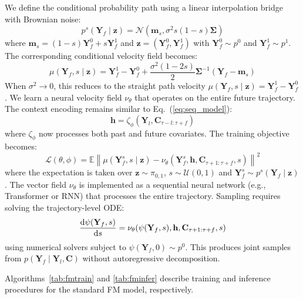 \documentclass[a4paper,10pt,twocolumn,preprint,3p]{elsarticle}
\begin{document}
We define the conditional probability path using a linear interpolation bridge with Brownian noise:
\begin{equation}
    p^s(\mathbf{Y}_f \mid \mathbf{z}) = \mathcal{N}\left(\mathbf{m}_s, \sigma^2 s(1-s)\mathbf{\Sigma}\right)
\end{equation}
where $\mathbf{m}_s = (1-s)\mathbf{Y}_f^0 + s\mathbf{Y}_f^1$ and $\mathbf{z} = (\mathbf{Y}_f^0, \mathbf{Y}_f^1)$ with $\mathbf{Y}_f^0 \sim p^0$ and $\mathbf{Y}_f^1 \sim p^1$. The corresponding conditional velocity field becomes:
\begin{equation}
    \mu(\mathbf{Y}_f, s\mid\mathbf{z}) = \mathbf{Y}_f^1 - \mathbf{Y}_f^0 + \frac{\sigma^2(1-2s)}{2}\mathbf{\Sigma}^{-1}(\mathbf{Y}_f - \mathbf{m}_s)
\end{equation}
When $\sigma^2 \to 0$, this reduces to the straight path velocity $\mu(\mathbf{Y}_f,s\mid\mathbf{z}) = \mathbf{Y}_f^1 - \mathbf{Y}_f^0$.
We learn a neural velocity field $\nu_\theta$ that operates on the entire future trajectory. The context encoding remains similar to Eq.~(\ref{eq:seq_model}):
\begin{equation}
    \mathbf{h} = \zeta_\phi(\mathbf{Y}_l, \mathbf{C}_{\tau-l:\tau+f})
\end{equation}
where $\zeta_\phi$ now processes both past and future covariates. The training objective becomes:
\begin{equation}
    \mathcal{L}(\theta, \phi) = \mathbb{E} \left\| \mu(\mathbf{Y}_f^s, s\mid\mathbf{z}) - \nu_\theta(\mathbf{Y}_f^s, \mathbf{h}, \mathbf{C}_{\tau+1:\tau+f}, s) \right\|^2
\end{equation}
where the expectation is taken over $\mathbf{z} \sim \pi_{0,1}$, $s \sim \mathcal{U}(0,1)$ and $\mathbf{Y}_f^s \sim p^s(\mathbf{Y}_f\mid\mathbf{z})$. The vector field $\nu_\theta$ is implemented as a sequential neural network (e.g., Transformer or RNN) that processes the entire trajectory.
Sampling requires solving the trajectory-level ODE:
\begin{equation}
    \dv{\psi(\mathbf{Y}_f,s)}{s} = \nu_\theta(\psi(\mathbf{Y}_f,s), \mathbf{h}, \mathbf{C}_{\tau+1:\tau+f}, s)
\end{equation}
using numerical solvers subject to $\psi(\mathbf{Y}_f,0) \sim p^0$. This produces joint samples from $p(\mathbf{Y}_f\mid\mathbf{Y}_l,\mathbf{C})$ without autoregressive decomposition.

Algorithms~\ref{tab:fmtrain} and \ref{tab:fminfer} describe training and inference procedures for the standard FM model, respectively.
\end{document}
